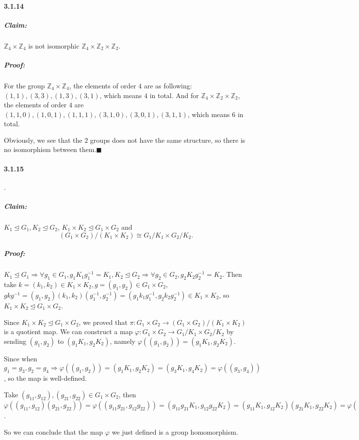 \documentclass[11pt]{article}
\begin{document}
	\paragraph{3.1.14}
		\subparagraph{Claim:}$\mathbb{Z}_4 \times \mathbb{Z}_4$ is not isomorphic $\mathbb{Z}_4 \times \mathbb{Z}_2 \times \mathbb{Z}_2$.
		\subparagraph{Proof:} For the group $\mathbb{Z}_4 \times \mathbb{Z}_4$, the elements of order $4$ are as following: $(1, 1), (3, 3), (1, 3), (3, 1)$, which means $4$ in total. And for $\mathbb{Z}_4 \times \mathbb{Z}_2 \times \mathbb{Z}_2$, the elements of order $4$ are $(1, 1, 0), (1, 0, 1), (1, 1, 1), (3, 1, 0), (3, 0, 1), (3, 1, 1)$, which means $6$ in total. 
		
		Obviously, we see that the $2$ groups does not have the same structure, so there is no isomorphism between them.$\blacksquare$
	\paragraph{3.1.15}.
		\subparagraph{Claim:} $K_1 \unlhd G_1, K_2 \unlhd G_2$, $K_1 \times K_2 \unlhd G_1 \times G_2$ and 
			\[(G_1 \times G_2) / (K_1 \times K_2) \cong G_1 / K_1 \times G_2 / K_2.\]
		\subparagraph{Proof:} $K_1 \unlhd G_1 \Rightarrow \forall g_1 \in G_1, g_1K_1g_1^{-1} = K_1, K_2 \unlhd G_2 \Rightarrow \forall g_2 \in G_2, g_2K_2g_2^{-1} = K_2$. Then take $k = (k_1, k_2) \in K_1 \times K_2, g = (g_1, g_2) \in G_1 \times G_2$, $gkg^{-1} = (g_1, g_2)(k_1, k_2)(g_1^{-1}, g_2^{-1}) = (g_1k_1g_1^{-1}, g_2k_2g_2^{-1}) \in K_1 \times K_2$, so $K_1 \times K_2 \unlhd G_1 \times G_2$.
		
		Since $K_1 \times K_2 \unlhd G_1 \times G_2$, we proved that $\pi: G_1 \times G_2 \rightarrow (G_1 \times G_2) / (K_1 \times K_2)$ is a quotient map. We can construct a map $\varphi: G_1 \times G_2 \rightarrow G_1 / K_1 \times G_2 / K_2$ by sending $(g_1, g_2)$ to $(g_1K_1, g_2K_2)$, namely $\varphi((g_1, g_2)) = (g_1K_1, g_2K_2)$. 
		
		Since when $g_1 = g_3, g_2 = g_4 \Rightarrow \varphi((g_1, g_2)) = (g_1K_1, g_2K_2) = (g_3K_1, g_4K_2) = \varphi((g_3, g_4))$, so the map is well-defined.
		
		Take $(g_{11}, g_{12}), (g_{21}, g_{22}) \in G_1 \times G_2$, then $\varphi((g_{11}, g_{12})(g_{21}, g_{22})) = \varphi((g_{11}g_{21}, g_{12}g_{22})) = (g_{11}g_{21}K_1, g_{12}g_{22}K_2) = (g_{11}K_1, g_{12}K_2)(g_{21}K_1, g_{22}K_2) = \varphi((g_{11}, g_{12}))\varphi((g_{21}, g_{22}))$. 
		
		So we can conclude that the map $\varphi$ we just defined is a group homomorphism.
		
\end{document}
